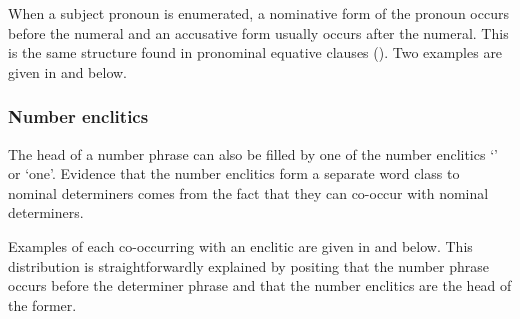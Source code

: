 When a subject pronoun is enumerated,
a nominative form of the pronoun occurs before the numeral
and an accusative form usually occurs after the numeral.
This is the same structure found in pronominal equative clauses ().
Two examples are given in  and  below.

\begin{exe}
	\label{ex:130909-6, 3.39}
	\label{ex:Mark 16:3--4}
\end{exe}

\subsubsection{Number enclitics}\label{sec:NumEnc sec:OthNomMod}
The head of a number phrase can also be filled by one of the number enclitics
 `{\ein}' or  `one'.
Evidence that the number enclitics form a separate word class to nominal
determiners comes from the fact that they can co-occur with nominal determiners.

Examples of each co-occurring with an enclitic
are given in  and  below.
This distribution is straightforwardly explained by positing that the number phrase
occurs before the determiner phrase and that the number enclitics
are the head of the former.

